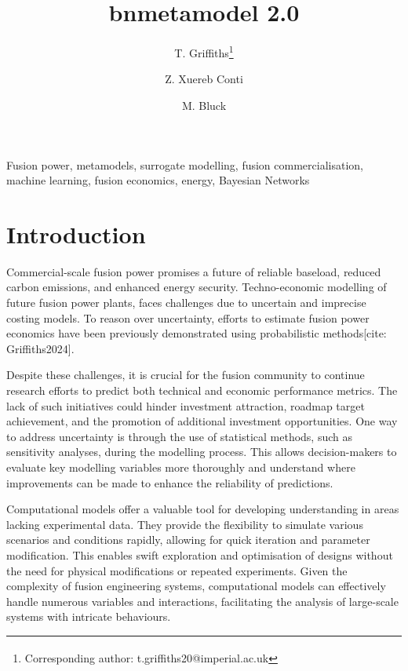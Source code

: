 \documentclass[journal]{IEEEtran}
\begin{document}
\title{bnmetamodel 2.0}

\author[1]{T. Griffiths\thanks{\textsuperscript{\Cross}Corresponding author: t.griffiths20@imperial.ac.uk}}
\author[2]{Z. Xuereb Conti}
\author[1]{M. Bluck}

\vspace{-15pt}

\maketitle

\begin{abstract}

\end{abstract}

\begin{IEEEkeywords}
Fusion power, metamodels, surrogate modelling, fusion commercialisation, machine learning, fusion economics, energy, Bayesian Networks
\end{IEEEkeywords}
\vspace{-2ex}

\section{Introduction}
Commercial-scale fusion power promises a future of reliable baseload, reduced carbon emissions, and enhanced energy security. Techno-economic modelling of future fusion power plants, faces challenges due to uncertain and imprecise costing models. To reason over uncertainty, efforts to estimate fusion power economics have been previously demonstrated using probabilistic methods[cite: Griffiths2024].

Despite these challenges, it is crucial for the fusion community to continue research efforts to predict both technical and economic performance metrics. The lack of such initiatives could hinder investment attraction, roadmap target achievement, and the promotion of additional investment opportunities. One way to address uncertainty is through the use of statistical methods, such as sensitivity analyses, during the modelling process. This allows decision-makers to evaluate key modelling variables more thoroughly and understand where improvements can be made to enhance the reliability of predictions.

Computational models offer a valuable tool for developing understanding in areas lacking experimental data. They provide the flexibility to simulate various scenarios and conditions rapidly, allowing for quick iteration and parameter modification. This enables swift exploration and optimisation of designs without the need for physical modifications or repeated experiments. Given the complexity of fusion engineering systems, computational models can effectively handle numerous variables and interactions, facilitating the analysis of large-scale systems with intricate behaviours.
\end{document}
